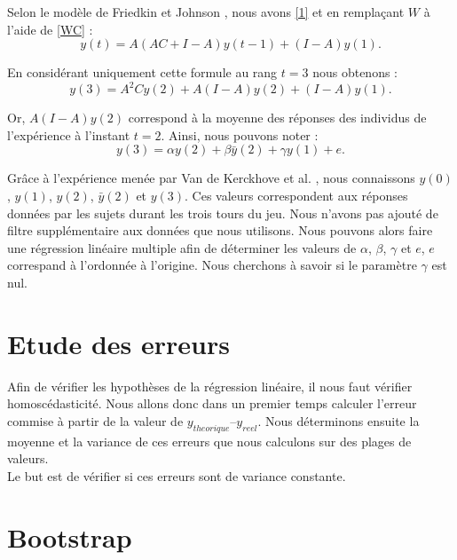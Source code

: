 \documentclass{scrreprt}
\begin{document}
\begin{multicols}{2}
Selon le modèle de Friedkin et Johnson \cite{FJ}, nous avons \eqref{1} et en remplaçant $W$ à l’aide de \eqref{WC} :\\

\begin{equation}
\label{21}
y(t) =A(AC+I-A)y(t-1)+(I-A)y(1).
\end{equation}

En considérant uniquement cette formule au rang $t = 3$ nous obtenons :\\
\begin{equation}
\label{22}
y(3) = A^2C y(2) + A(I-A)y(2) + (I-A)y(1).
\end{equation}

Or, $A(I-A)y(2)$ correspond à la moyenne des réponses des individus de l'expérience à l'instant $t=2$. Ainsi, nous pouvons noter :\\
\begin{equation}
\label{23}
y(3) = \alpha y(2) + \beta \bar{y}(2) + \gamma y(1) + e.
\end{equation}

Grâce à l’expérience menée par Van de Kerckhove et al. \cite{VMG}, nous connaissons $y(0)$, $y(1)$, $y(2)$, $\bar{y}(2)$ et $y(3)$. Ces valeurs correspondent aux réponses données par les sujets durant les trois tours du jeu. Nous n’avons pas ajouté de filtre supplémentaire aux données que nous utilisons. Nous pouvons alors faire une régression linéaire multiple afin de déterminer les valeurs de $\alpha$, $\beta$, $\gamma$ et $e$, $e$ correspand à l'ordonnée à l'origine. Nous cherchons à savoir si le paramètre $\gamma$ est nul.\\

\section{Etude des erreurs}

Afin de vérifier les hypothèses de la régression linéaire, il nous faut vérifier homoscédasticité. Nous allons donc dans un premier temps calculer l’erreur commise à partir de la valeur de $y_{theorique} – y_{reel}$. Nous déterminons ensuite la moyenne et la variance de ces erreurs que nous calculons sur des plages de valeurs.\\

Le but est de vérifier si ces erreurs sont de variance constante.\\

\section{Bootstrap}


\end{multicols}
\end{document}
